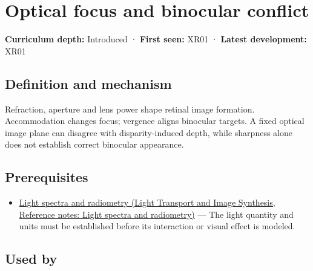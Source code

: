 \hypertarget{appendix-f90cee1be7a4}{}\label{referencestart:appendix-f90cee1be7a4}
\section{Optical focus and binocular conflict}\label{appendix-f90cee1be7a4-optical-focus-and-binocular-conflict}

\hypertarget{appendix-f90cee1be7a4-optical-focus-and-binocular-conflict}{}

\textbf{Curriculum depth:} Introduced · \textbf{First seen:} XR01 · \textbf{Latest development:} XR01

\begin{allmightroledefinition}

\subsection{Definition and mechanism}\label{appendix-f90cee1be7a4-definition-and-mechanism}

\hypertarget{appendix-f90cee1be7a4-definition-and-mechanism}{}

Refraction, aperture and lens power shape retinal image formation. Accommodation changes focus; vergence aligns binocular targets. A fixed optical image plane can disagree with disparity-induced depth, while sharpness alone does not establish correct binocular appearance.

\end{allmightroledefinition}

\subsection{Prerequisites}\label{appendix-f90cee1be7a4-prerequisites}

\hypertarget{appendix-f90cee1be7a4-prerequisites}{}

\begin{itemize}
\tightlist
\item
  \href{../04-Light-Transport-and-Image-Synthesis/main.pdf\#nameddest=appendix-215c2570199b}{Light spectra and radiometry (Light Transport and Image Synthesis, Reference notes: Light spectra and radiometry)} --- The light quantity and units must be established before its interaction or visual effect is modeled.
\end{itemize}

\subsection{Used by}\label{appendix-f90cee1be7a4-used-by}

